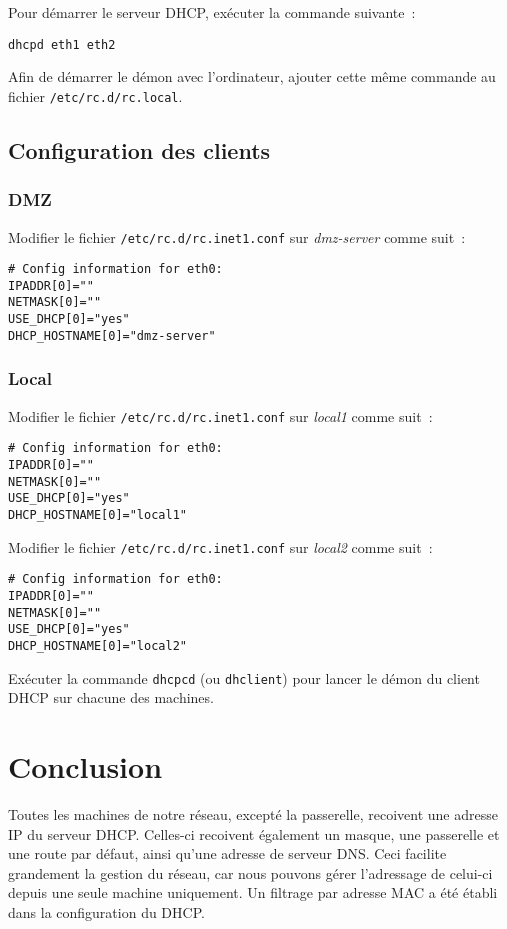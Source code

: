 \documentclass[11pt,a4paper,oneside]{article}
\begin{document}
Pour démarrer le serveur DHCP, exécuter la commande suivante~:
\begin{verbatim}
dhcpd eth1 eth2
\end{verbatim}

Afin de démarrer le démon avec l'ordinateur, ajouter cette même commande au
fichier \verb#/etc/rc.d/rc.local#.

\subsection{Configuration des clients}

\subsubsection{DMZ}
Modifier le fichier \verb#/etc/rc.d/rc.inet1.conf# sur \emph{dmz-server} comme
suit~:
\begin{verbatim}
# Config information for eth0:
IPADDR[0]=""
NETMASK[0]=""
USE_DHCP[0]="yes"
DHCP_HOSTNAME[0]="dmz-server"
\end{verbatim}

\subsubsection{Local}
Modifier le fichier \verb#/etc/rc.d/rc.inet1.conf# sur \emph{local1} comme
suit~:
\begin{verbatim}
# Config information for eth0:
IPADDR[0]=""
NETMASK[0]=""
USE_DHCP[0]="yes"
DHCP_HOSTNAME[0]="local1"
\end{verbatim}

Modifier le fichier \verb#/etc/rc.d/rc.inet1.conf# sur \emph{local2} comme
suit~:
\begin{verbatim}
# Config information for eth0:
IPADDR[0]=""
NETMASK[0]=""
USE_DHCP[0]="yes"
DHCP_HOSTNAME[0]="local2"
\end{verbatim}

Exécuter la commande \verb#dhcpcd# (ou \verb#dhclient#) pour lancer le démon du
client DHCP sur chacune des machines.

\section{Conclusion}
Toutes les machines de notre réseau, excepté la passerelle, recoivent une
adresse IP du serveur DHCP. Celles-ci recoivent également un masque, une
passerelle et une route par défaut, ainsi qu'une adresse de serveur DNS. Ceci
facilite grandement la gestion du réseau, car nous pouvons gérer l'adressage de
celui-ci depuis une seule machine uniquement. Un filtrage par adresse MAC a été
établi dans la configuration du DHCP.
\end{document}
